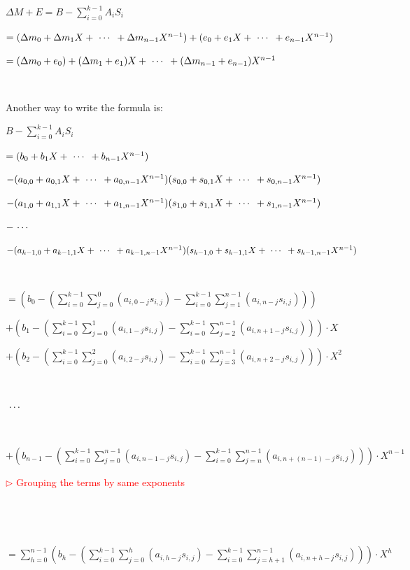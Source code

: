 $\Delta M + E = B - \sum\limits_{i=0}^{k-1}A_iS_i$ 

$ = (\Delta m_0 + \Delta m_1X + \text{ } \text{$\cdots$} \text{ } + \Delta m_{n-1}X^{n-1}) + (e_0 + e_1X + \text{ } \text{$\cdots$} \text{ } + e_{n-1}X^{n-1})$

$= (\Delta m_0 + e_0) + (\Delta m_1 + e_1)X + \text{ } \text{$\cdots$} \text{ } + (\Delta m_{n-1} + e_{n-1})X^{n-1}$

$ $

\noindent Another way to write the formula is:

$B - \sum\limits_{i=0}^{k-1}A_iS_i$ 

$ = (b_0 + b_1X + \text{ } \text{$\cdots$} \text{ } + b_{n-1}X^{n-1} )$ 

$ - (a_{0,0} + a_{0,1}X + \text{ } \text{$\cdots$} \text{ } + a_{0, n-1}X^{n-1})(s_{0,0} + s_{0,1}X + \text{ } \text{$\cdots$} \text{ } + s_{0, n-1}X^{n-1})$ 

$ - (a_{1,0} + a_{1,1}X + \text{ } \text{$\cdots$} \text{ } + a_{1, n-1}X^{n-1})(s_{1,0} + s_{1,1}X + \text{ } \text{$\cdots$} \text{ } + s_{1, n-1}X^{n-1})$

$ - \text{ } \text{$\cdots$} \text{ } $ 

$ - (a_{k-1,0} + a_{k-1,1}X + \text{ } \text{$\cdots$} \text{ } + a_{k-1, n-1}X^{n-1})(s_{k-1,0} + s_{k-1,1}X + \text{ } \text{$\cdots$} \text{ } + s_{k-1, n-1}X^{n-1})$ 

$ $

$ = \left(b_0 - \left( \sum\limits_{i=0}^{k-1} \sum\limits_{j=0}^{0}(a_{i,0-j}s_{i,j}) - \sum\limits_{i=0}^{k-1} \sum\limits_{j=1}^{n-1}(a_{i,n-j}s_{i,j}) \right)\right)$

$ + \left(b_1 - \left( \sum\limits_{i=0}^{k-1} \sum\limits_{j=0}^{1}(a_{i,1-j}s_{i,j}) - \sum\limits_{i=0}^{k-1} \sum\limits_{j=2}^{n-1}(a_{i,n+1-j}s_{i,j})   \right) \right)\cdot X$ 



$ + \left(b_2 - \left( \sum\limits_{i=0}^{k-1} \sum\limits_{j=0}^{2}(a_{i,2-j}s_{i,j}) - \sum\limits_{i=0}^{k-1} \sum\limits_{j=3}^{n-1}(a_{i,n+2-j}s_{i,j})   \right) \right)\cdot X^2$ 

$ $

$\text{ } \text{$\cdots$} \text{ }$ 

$ $

$ + \left(b_{n-1} - \left(  \sum\limits_{i=0}^{k-1} \sum\limits_{j=0}^{n-1}(a_{i,n-1-j}s_{i,j}) - \sum\limits_{i=0}^{k-1} \sum\limits_{j=n}^{n-1}(a_{i,n+(n-1)-j}s_{i,j})  \right) \right)\cdot X^{n-1}$ 

\textcolor{red}{ $\rhd$ Grouping the terms by same exponents}

$ $


$ $

$= \sum\limits_{h=0}^{n-1}  \left(b_h - \left(  \sum\limits_{i=0}^{k-1} \sum\limits_{j=0}^{h}(a_{i,h-j}s_{i,j}) - \sum\limits_{i=0}^{k-1} \sum\limits_{j=h+1}^{n-1}(a_{i,n+h-j}s_{i,j})  \right) \right)\cdot X^{h}  $


